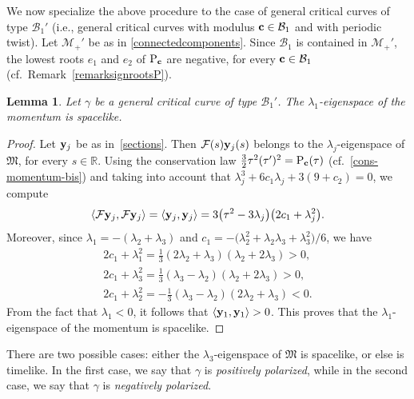 \documentclass[10pt,a4paper]{amsart}
\numberwithin{equation}{section}
\newtheorem{Lemma}[Theorem]{Lemma}
\def\R{\mathbb{R}}
\begin{document}
We now specialize the above procedure to the case of general critical curves of type ${\mathcal B}_1'$ (i.e., general critical
curves with modulus ${\bf c}\in {\mathcal B}_1$ and with periodic twist). Let ${\mathcal M}_+'$ be as in
\eqref{connectedcomponents}.
Since ${\mathcal B}_1$ is contained in ${\mathcal M}_+'$, the lowest roots $e_1$ and $e_2$ of ${\rm P}_{{\bf c}}$ are negative,
for every ${\bf c}\in {\mathcal B}_1$ (cf.\ Remark~\ref{remarksignrootsP}).

\begin{Lemma} \label{Lemma1ss:integrability2}
Let $\gamma$ be a general critical curve of type ${\mathcal B}_1'$. The $\lambda_1$-eigenspace of the momentum is spacelike.
\end{Lemma}

\begin{proof}
Let ${\bf y}_j$ be as in~\eqref{sections}. Then ${\mathcal F}(s){\bf y}_j(s)$ belongs to the
$\lambda_j$-eigenspace of ${\mathfrak M}$, for every $s\in \R$.
Using the conservation law {$\frac32\tau^2 (\tau')^2={\rm P}_{{\bf c}}(\tau)$} (cf.~\eqref{cons-momentum-bis})
and taking into account that $\lambda_j^3+6c_1\lambda_j+3(9+c_2)=0$, {we} compute
\[
 \langle {\mathcal F}{\bf y}_j,{\mathcal F}{\bf y}_j\rangle
 = \langle {\bf y}_j,{\bf y}_j\rangle =3\big(\tau^2-3\lambda_j\big)\big(2c_1+\lambda_j^2\big).
\]
Moreover, since $\lambda_1=-(\lambda_2+\lambda_3)$ and $c_1=-\big(\lambda_2^2+\lambda_2\lambda_3+\lambda_3^2\big)/6$,
we have
\begin{gather*}
2c_1+\lambda_1^2=\frac{1}{3}(2\lambda_2+\lambda_3)(\lambda_2+2\lambda_3)>0,\\
2c_1+\lambda_3^2=\frac{1}{3}(\lambda_3-\lambda_2)(\lambda_2+2\lambda_3)>0,\\
2c_1+\lambda_2^2=-\frac{1}{3}(\lambda_3-\lambda_2)(2\lambda_2+\lambda_3)<0.
\end{gather*}
From the fact that $\lambda_1<0$, it follows that $\langle {\bf y}_1,{\bf y}_1\rangle > 0$.
This proves that the $\lambda_1$-eigenspace of the momentum is spacelike.
\end{proof}

\begin{Definition}
There are two possible cases: either the $\lambda_3$-eigenspace of ${\mathfrak M}$ is spacelike, or else is timelike.
In the first case, we say that $\gamma$ is \emph{positively polarized}, while in the second case, we say that
$\gamma$ is \emph{negatively polarized}.
\end{Definition}
\end{document}
